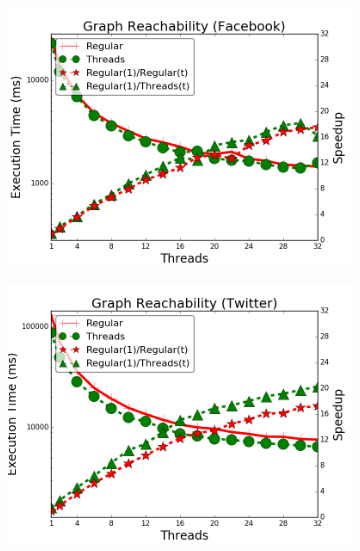 \begin{figure}[]
        \centering
        \begin{subfigure}[b]{\plotsize\textwidth}
           \includegraphics[width=\textwidth]{experiments/threads/cmp-search-facebook.png}
           \label{fig:threads:search_facebook}
        \end{subfigure}
        \spacing
        \begin{subfigure}[b]{\plotsize\textwidth}
           \includegraphics[width=\textwidth]{experiments/threads/cmp-search-twitter.png}
\end{subfigure}
\end{figure}
